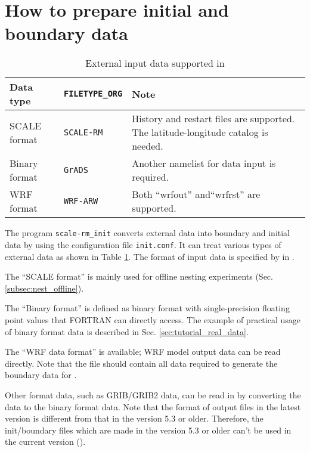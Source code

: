 \section{How to prepare initial and boundary data} \label{sec:adv_datainput}

\begin{table}[tbh]
\begin{center}
\caption{External input data supported in \scalelib}
\begin{tabularx}{150mm}{l|l|X} \hline
 \rowcolor[gray]{0.9} Data type   & \verb|FILETYPE_ORG|  & Note \\ \hline
 SCALE format   & \verb|SCALE-RM|     & History and restart files are supported. The latitude-longitude catalog is needed. \\ \hline
 Binary format  & \verb|GrADS|        & Another namelist for data input is required.    \\ \hline
 WRF format     & \verb|WRF-ARW|      & Both ``wrfout''  and``wrfrst'' are supported.\\ \hline
\end{tabularx}
\label{tab:inputdata_format}
\end{center}
\end{table}

The program \verb|scale-rm_init| converts external data into boundary and initial data by using the configuration file \verb|init.conf|.
It can treat various types of external data as shown in Table \ref{tab:inputdata_format}.
The format of input data is specified by  in .

The ``SCALE format'' is mainly used for offline nesting experiments (Sec. \ref{subsec:nest_offline}).

The ``Binary format'' is defined as binary format with single-precision floating point values that FORTRAN can directly access.
The example of practical usage of binary format data is described in Sec. \ref{sec:tutorial_real_data}.

The ``WRF data format'' is available; WRF model output data can be read directly.
Note that the file should contain all data required to generate the boundary data for \scalerm.

Other format data, such as GRIB/GRIB2 data, can be read in \scale by converting the data to the binary format data.
Note that the format of output files in the latest version is different from that in the version 5.3 or older.
Therefore, the init/boundary files which are made in the version 5.3 or older can't be used in the current version (\scalelib \version).

